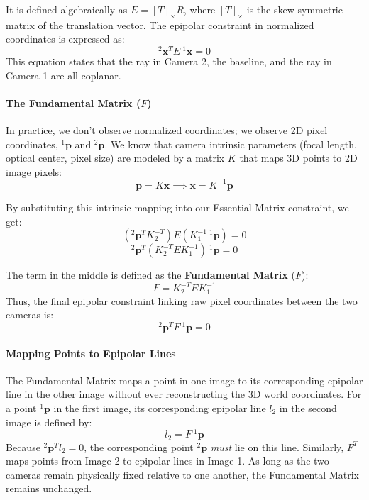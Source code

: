 It is defined algebraically as $E = [T]_\times R$, where $[T]_\times$ is the skew-symmetric matrix of the translation vector. The epipolar constraint in normalized coordinates is expressed as:
$$^2\boldsymbol{x}^T E \: ^1\boldsymbol{x} = 0$$
This equation states that the ray in Camera 2, the baseline, and the ray in Camera 1 are all coplanar.

\paragraph{The Fundamental Matrix ($F$)}
In practice, we don't observe normalized coordinates; we observe 2D pixel coordinates, $^1\boldsymbol{p}$ and $^2\boldsymbol{p}$. We know that camera intrinsic parameters (focal length, optical center, pixel size) are modeled by a matrix $K$ that maps 3D points to 2D image pixels:
$$\boldsymbol{p} = K \boldsymbol{x} \implies \boldsymbol{x} = K^{-1} \boldsymbol{p}$$

By substituting this intrinsic mapping into our Essential Matrix constraint, we get:
$$(^2\boldsymbol{p}^T K_2^{-T}) E (K_1^{-1} \: ^1\boldsymbol{p}) = 0$$
$$^2\boldsymbol{p}^T (K_2^{-T} E K_1^{-1}) \: ^1\boldsymbol{p} = 0$$

The term in the middle is defined as the \textbf{Fundamental Matrix} ($F$):
$$F = K_2^{-T} E K_1^{-1}$$
Thus, the final epipolar constraint linking raw pixel coordinates between the two cameras is:
$$^2\boldsymbol{p}^T F \: ^1\boldsymbol{p} = 0$$

\paragraph{Mapping Points to Epipolar Lines}
The Fundamental Matrix maps a point in one image to its corresponding epipolar line in the other image without ever reconstructing the 3D world coordinates. 
For a point $^1\boldsymbol{p}$ in the first image, its corresponding epipolar line $l_2$ in the second image is defined by:
$$l_2 = F \: ^1\boldsymbol{p}$$
Because $^2\boldsymbol{p}^T l_2 = 0$, the corresponding point $^2\boldsymbol{p}$ \textit{must} lie on this line. 
Similarly, $F^T$ maps points from Image 2 to epipolar lines in Image 1. As long as the two cameras remain physically fixed relative to one another, the Fundamental Matrix remains unchanged.

